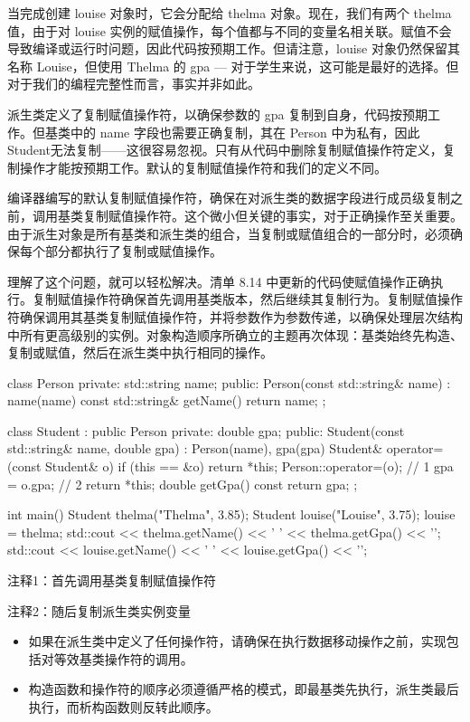 
当完成创建 louise 对象时，它会分配给 thelma 对象。现在，我们有两个 thelma 值，由于对 louise 实例的赋值操作，每个值都与不同的变量名相关联。赋值不会导致编译或运行时问题，因此代码按预期工作。但请注意，louise 对象仍然保留其名称 Louise，但使用 Thelma 的 gpa — 对于学生来说，这可能是最好的选择。但对于我们的编程完整性而言，事实并非如此。

派生类定义了复制赋值操作符，以确保参数的 gpa 复制到自身，代码按预期工作。但基类中的 name 字段也需要正确复制，其在 Person 中为私有，因此Student无法复制——这很容易忽视。只有从代码中删除复制赋值操作符定义，复制操作才能按预期工作。默认的复制赋值操作符和我们的定义不同。

编译器编写的默认复制赋值操作符，确保在对派生类的数据字段进行成员级复制之前，调用基类复制赋值操作符。这个微小但关键的事实，对于正确操作至关重要。由于派生对象是所有基类和派生类的组合，当复制或赋值组合的一部分时，必须确保每个部分都执行了复制或赋值操作。


理解了这个问题，就可以轻松解决。清单 8.14 中更新的代码使赋值操作正确执行。复制赋值操作符确保首先调用基类版本，然后继续其复制行为。复制赋值操作符确保调用其基类复制赋值操作符，并将参数作为参数传递，以确保处理层次结构中所有更高级别的实例。对象构造顺序所确立的主题再次体现：基类始终先构造、复制或赋值，然后在派生类中执行相同的操作。


\begin{cpp}
class Person {
private:
  std::string name;
  public:
  Person(const std::string& name) : name(name) {}
  const std::string& getName() { return name; }
};

class Student : public Person {
private:
  double gpa;
public:
  Student(const std::string& name, double gpa) : Person(name), gpa(gpa) {}
  Student& operator=(const Student& o) {
    if (this == &o)
      return *this;
    Person::operator=(o); // 1
    gpa = o.gpa; // 2
    return *this;
  }
  double getGpa() const { return gpa; }
};

int main() {
  Student thelma("Thelma", 3.85);
  Student louise("Louise", 3.75);
  louise = thelma;
  std::cout << thelma.getName() << ' ' << thelma.getGpa() << '\n';
  std::cout << louise.getName() << ' ' << louise.getGpa() << '\n';
}
\end{cpp}

{\footnotesize
注释1：首先调用基类复制赋值操作符

注释2：随后复制派生类实例变量
}


\begin{itemize}
\item
如果在派生类中定义了任何操作符，请确保在执行数据移动操作之前，实现包括对等效基类操作符的调用。

\item
构造函数和操作符的顺序必须遵循严格的模式，即最基类先执行，派生类最后执行，而析构函数则反转此顺序。
\end{itemize}














